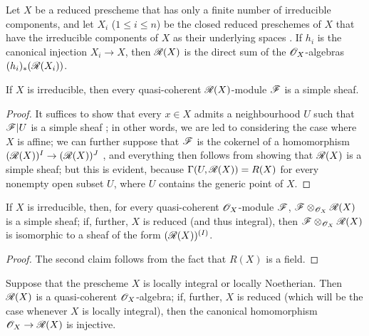 \begin{corollary}[7.3.4]
\label{I.7.3.4}
Let $X$ be a reduced prescheme that has only a finite number of irreducible components, and let $X_i$ ($1\leq i\leq n$) be the closed reduced preschemes of $X$ that have the irreducible components of $X$ as their underlying spaces .
If $h_i$ is the canonical injection $X_i\to X$, then $\mathscr{R}(X)$ is the direct sum of the $\mathscr{O}_X$-algebras $(h_i)_*(\mathscr{R}(X_i))$.
\end{corollary}

\begin{corollary}[7.3.5]
\label{I.7.3.5}
If $X$ is irreducible, then every quasi-coherent $\mathscr{R}(X)$-module $\mathscr{F}$ is a simple sheaf.
\end{corollary}

\begin{proof}
It suffices to show that every $x\in X$ admits a neighbourhood $U$ such that $\mathscr{F}|U$ is a simple sheaf ; in other words, we are led to considering the case where $X$ is affine; we can further suppose that $\mathscr{F}$ is the cokernel of a homomorphism $(\sh{R}(X))^{I}\to(\sh{R}(X))^{J}$ , and everything then follows from showing that $\mathscr{R}(X)$ is a simple sheaf; but this is evident, because $\Gamma(U,\mathscr{R}(X))=R(X)$ for every nonempty open subset $U$, where $U$ contains the generic point of $X$.
\end{proof}

\begin{corollary}[7.3.6]
\label{I.7.3.6}
If $X$ is irreducible, then, for every quasi-coherent $\mathscr{O}_X$-module $\mathscr{F}$, $\mathscr{F}\otimes_{\mathscr{O}_X}\mathscr{R}(X)$ is a simple sheaf; if, further, $X$ is reduced (and thus integral), then $\mathscr{F}\otimes_{\mathscr{O}_X}\mathscr{R}(X)$ is isomorphic to a sheaf of the form $(\mathscr{R}(X))^{(I)}$.
\end{corollary}

\begin{proof}
The second claim follows from the fact that $R(X)$ is a field.
\end{proof}

\begin{proposition}[7.3.7]
\label{I.7.3.7}
Suppose that the prescheme $X$ is locally integral or locally Noetherian.
Then $\mathscr{R}(X)$ is a quasi-coherent $\mathscr{O}_X$-algebra; if, further, $X$ is reduced (which will be the case whenever $X$ is locally integral), then the canonical homomorphism $\sh{O}_X\to\sh{R}(X)$ is injective.
\end{proposition}

